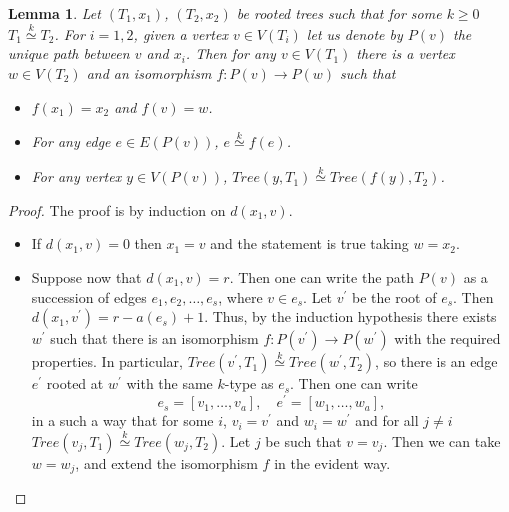 \documentclass[11pt,notitlepage]{report}
\newtheorem{lemma}{Lemma}[chapter]
\theoremstyle{definition}
\theoremstyle{remark}
\newcommand{\morph}[1]{\stackrel{#1}{\simeq}}
\begin{document}
\begin{lemma}
	Let $(T_1,x_1)$, $(T_2,x_2)$ be rooted trees such that for some $k\geq 0$
	$T_1\morph{k} T_2$. For $i=1,2$, given a vertex $v\in V(T_i)$ let us denote by
	$P(v)$ the unique path between $v$ and $x_i$.
	Then for any $v\in V(T_1)$ there is a vertex $w\in V(T_2)$ and an isomorphism
	$f:P(v)\rightarrow P(w)$ such that
	\begin{itemize}
		\item[(1)]  $f(x_1)=x_2$ and $f(v)=w$.
		\item[(2)] For any edge $e\in E(P(v))$, $e\morph{k} f(e)$.
		\item[(3)] For any vertex $y\in V(P(v))$, $Tree(y,T_1)\morph{k} Tree(f(y),T_2)$.
	\end{itemize}
\end{lemma}
\begin{proof}
	The proof is by induction on $d(x_1, v)$.
	\begin{itemize}
		\item If $d(x_1,v)=0$ then $x_1=v$ and the statement is true taking $w=x_2$.
		\item Suppose now that $d(x_1,v)=r$. Then one can write the path $P(v)$ as a
		succession of edges $e_1,e_2,\dots, e_s$, where $v\in e_s$. Let $v^\prime$ be 
		the root of $e_s$. Then $d(x_1,v^\prime)=r-a(e_s)+1$. Thus, by the
		induction hypothesis there exists $w^\prime$ such that there is an isomorphism
		$f: P(v^\prime)\rightarrow P(w^\prime)$ with the required properties. 
		In particular, $Tree(v^\prime,T_1)\morph{k}Tree(w^\prime,T_2)$, so there is an
		edge $e^\prime$ rooted at $w^\prime$ with the same $k$-type as $e_s$. Then one can write
		\[e_s=[v_1,\dots,v_a], \quad  e^\prime=[w_1,\dots,w_a], \]
		in a such a way that for some $i$, $v_i=v^\prime$ and $w_i=w^\prime$ and for all $j\neq i$
		$Tree(v_j,T_1)\morph{k} Tree(w_j,T_2)$. Let $j$ be such that $v=v_j$. Then we can take
		$w=w_j$, and extend the isomorphism $f$ in the evident way. 
	\end{itemize}
\end{proof}
\end{document}
